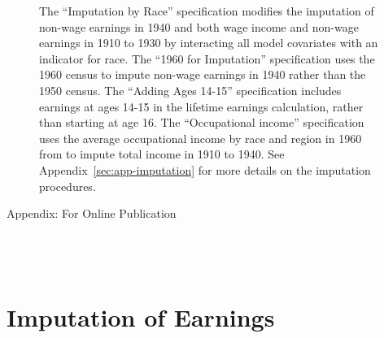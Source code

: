 \documentclass[12pt]{article}
\begin{document}
\begin{figure}[!ht]
{        The ``Imputation by Race'' specification modifies the imputation of non-wage earnings in 1940 and both wage income and non-wage earnings in 1910 to 1930 by interacting all model covariates with an indicator for race. 
        The ``1960 for Imputation'' specification uses the 1960 census to impute non-wage earnings in 1940 rather than the 1950 census. 
        The ``Adding Ages 14-15'' specification includes earnings at ages 14-15 in the lifetime earnings calculation, rather than starting at age 16. 
        The ``Occupational income'' specification uses the average occupational income by race and region in 1960 from  to impute total income in 1910 to 1940. 
        See Appendix~\ref{sec:app-imputation} for more details on the imputation procedures. 
    }
\label{fig:robust-lifetime-utility}
\end{figure}
\restoregeometry

\FloatBarrier
\appendix
\singlespacing

\setcounter{page}{1}

\renewcommand*{\thepage}{A\arabic{page}}

\FloatBarrier
\begin{center}
{\Large Appendix: For Online Publication}
 ~\\ ~\\
 ~\\ ~\\
\end{center}


\FloatBarrier
\newpage
\section{Imputation of Earnings \label{sec:app-imputation}}
\setcounter{table}{0}
\setcounter{figure}{0}
\singlespacing
\end{document}
